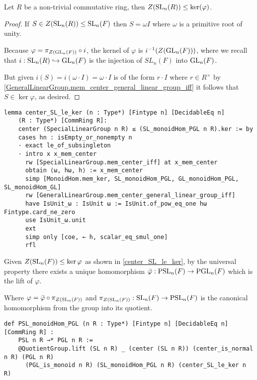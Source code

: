 \begin{lemma}
\label{center_SL_le_ker}
\leanok
Let $R$ be a non-trivial commutative ring, then $Z(\operatorname{SL}_n(R)) \le \ker (\varphi)$.
\end{lemma}
\begin{proof}
\leanok
If $S \in Z(\operatorname{SL}_n(R)) \leq \operatorname{SL}_n(F)$ then $S = \omega I$ where $\omega$ is a primitive root of unity.

Because $\varphi = \pi_{Z(\operatorname{GL}_n(F))} \circ i$, the kernel of $\varphi$ is $i^{-1}(Z(\operatorname{GL}_n(F)))$, where we recall that $i : \operatorname{SL}_n(R) \hookrightarrow \operatorname{GL}_n(F)$ is the injection of $SL_n(F)$ into $\operatorname{GL}_n(F)$.

But given $i(S) = i(\omega \cdot I) = \omega \cdot I$ is of the form $r \cdot I$ where $r \in R^\times$ by \ref{GeneralLinearGroup.mem_center_general_linear_group_iff} it follows that $S \in \ker \varphi$, as desired.
\end{proof}
\begin{footnotesize}
\begin{verbatim}
lemma center_SL_le_ker (n : Type*) [Fintype n] [DecidableEq n]
    (R : Type*) [CommRing R]:
    center (SpecialLinearGroup n R) ≤ (SL_monoidHom_PGL n R).ker := by
    cases hn : isEmpty_or_nonempty n
    · exact le_of_subsingleton
    · intro x x_mem_center
      rw [SpecialLinearGroup.mem_center_iff] at x_mem_center
      obtain ⟨ω, hω, h⟩ := x_mem_center
      simp [MonoidHom.mem_ker, SL_monoidHom_PGL, GL_monoidHom_PGL, SL_monoidHom_GL]
      rw [GeneralLinearGroup.mem_center_general_linear_group_iff]
      have IsUnit_ω : IsUnit ω := IsUnit.of_pow_eq_one hω Fintype.card_ne_zero
      use IsUnit_ω.unit
      ext
      simp only [coe, ← h, scalar_eq_smul_one]
      rfl
\end{verbatim}
\end{footnotesize}



\begin{definition}
\label{PSL_monoidHom_PGL}
\leanok
    Given $Z(\operatorname{SL}_n(F)) \leq \ker \varphi$ as shown in \ref{center_SL_le_ker}, by the universal property there exists a unique homomorphism $\bar{\varphi} : \operatorname{PSL}_n(F) \rightarrow \operatorname{PGL}_n(F)$ which is the lift of $\varphi$. 
    
    Where $\varphi = \bar{\varphi} \circ \pi_{Z(\operatorname{SL}_n(F))}$ and $\pi_{Z(\operatorname{SL}_n(F))} : \operatorname{SL}_n(F) \rightarrow \operatorname{PSL}_n(F)$ is the canonical homomorphism from the group into its quotient.
\end{definition}
\begin{footnotesize}
\begin{verbatim}
def PSL_monoidHom_PGL (n R : Type*) [Fintype n] [DecidableEq n] [CommRing R] :
    PSL n R →* PGL n R :=
    @QuotientGroup.lift (SL n R) _ (center (SL n R)) (center_is_normal n R) (PGL n R)
      (PGL_is_monoid n R) (SL_monoidHom_PGL n R) (center_SL_le_ker n R)
  
\end{verbatim}
\end{footnotesize}


